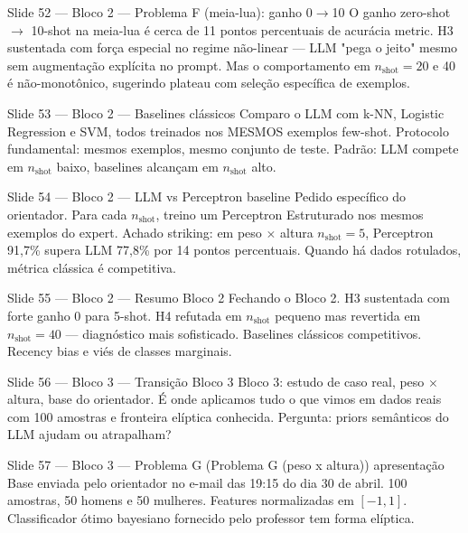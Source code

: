 \documentclass[aspectratio=169,10pt]{beamer}
\begin{document}
\begin{frame}{Slide 52 --- Bloco 2 --- Problema F (meia-lua): ganho 0$\to$10}
\footnotesize
O ganho zero-shot $\to$ 10-shot na meia-lua \'e cerca de 11 pontos percentuais de acur\'acia metric. H3 sustentada com for\c{c}a especial no regime n\~ao-linear --- LLM "pega o jeito" mesmo sem augmenta\c{c}\~ao expl\'icita no prompt. Mas o comportamento em $n_{\text{shot}}=20$ e 40 \'e n\~ao-monot\^onico, sugerindo plateau com sele\c{c}\~ao espec\'ifica de exemplos.
\end{frame}

\begin{frame}{Slide 53 --- Bloco 2 --- Baselines cl\'assicos}
\footnotesize
Comparo o LLM com k-NN, Logistic Regression e SVM, todos treinados nos MESMOS exemplos few-shot. Protocolo fundamental: mesmos exemplos, mesmo conjunto de teste. Padr\~ao: LLM compete em $n_{\text{shot}}$ baixo, baselines alcan\c{c}am em $n_{\text{shot}}$ alto.
\end{frame}

\begin{frame}{Slide 54 --- Bloco 2 --- LLM vs Perceptron baseline}
\footnotesize
Pedido espec\'ifico do orientador. Para cada $n_{\text{shot}}$, treino um Perceptron Estruturado nos mesmos exemplos do expert. Achado striking: em peso $\times$ altura $n_{\text{shot}}=5$, Perceptron 91,7\% supera LLM 77,8\% por 14 pontos percentuais. Quando h\'a dados rotulados, m\'etrica cl\'assica \'e competitiva.
\end{frame}

\begin{frame}{Slide 55 --- Bloco 2 --- Resumo Bloco 2}
\footnotesize
Fechando o Bloco 2. H3 sustentada com forte ganho 0 para 5-shot. H4 refutada em $n_{\text{shot}}$ pequeno mas revertida em $n_{\text{shot}}=40$ --- diagn\'ostico mais sofisticado. Baselines cl\'assicos competitivos. Recency bias e vi\'es de classes marginais.
\end{frame}

\begin{frame}{Slide 56 --- Bloco 3 --- Transi\c{c}\~ao Bloco 3}
\footnotesize
Bloco 3: estudo de caso real, peso $\times$ altura, base do orientador. \'E onde aplicamos tudo o que vimos em dados reais com 100 amostras e fronteira el\'iptica conhecida. Pergunta: priors sem\^anticos do LLM ajudam ou atrapalham?
\end{frame}

\begin{frame}{Slide 57 --- Bloco 3 --- Problema G (Problema G (peso x altura)) apresenta\c{c}\~ao}
\footnotesize
Base enviada pelo orientador no e-mail das 19:15 do dia 30 de abril. 100 amostras, 50 homens e 50 mulheres. Features normalizadas em $[-1, 1]$. Classificador \'otimo bayesiano fornecido pelo professor tem forma el\'iptica.
\end{frame}
\end{document}
